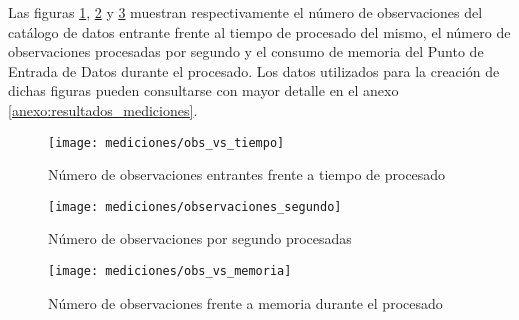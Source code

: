 	Las figuras \ref{fig:obs_vs_tiempo}, \ref{fig:obs_segundo} y  \ref{fig:obs_vs_memoria} muestran respectivamente el número de observaciones del catálogo de datos entrante frente al tiempo de procesado del mismo, el número de observaciones procesadas por segundo y el consumo de memoria del Punto de Entrada de Datos durante el procesado.  Los datos utilizados para la creación de dichas figuras pueden consultarse con mayor detalle en el anexo \ref{anexo:resultados_mediciones}.
	
	\begin{figure}[h]
		\centering
		\texttt{[image: mediciones/obs\_vs\_tiempo]}
		\caption{Número de observaciones entrantes frente a tiempo de procesado}
		\label{fig:obs_vs_tiempo}
	\end{figure}
	
	\begin{figure}[h]
		\centering
		\texttt{[image: mediciones/observaciones\_segundo]}
		\caption{Número de observaciones por segundo procesadas}
		\label{fig:obs_segundo}
	\end{figure}
	
	\begin{figure}[h]
		\centering
		\texttt{[image: mediciones/obs\_vs\_memoria]}
		\caption{Número de observaciones frente a memoria durante el procesado}
		\label{fig:obs_vs_memoria}
	\end{figure}	
	 

